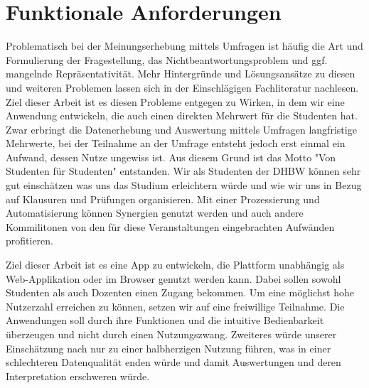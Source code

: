 \section{Funktionale Anforderungen} %
Problematisch bei der Meinungserhebung mittels Umfragen ist häufig die Art und Formulierung der Fragestellung, das Nichtbeantwortungsproblem und ggf. mangelnde Repräsentativität.
Mehr Hintergründe und Lösungsansätze zu diesen und weiteren Problemen lassen sich in der Einschlägigen Fachliteratur nachlesen.
Ziel dieser Arbeit ist es diesen Probleme entgegen zu Wirken, in dem wir eine Anwendung entwickeln, die auch einen direkten Mehrwert für die Studenten hat.
Zwar erbringt die Datenerhebung und Auswertung mittels Umfragen langfristige Mehrwerte, bei der Teilnahme an der Umfrage entsteht jedoch erst einmal ein Aufwand, dessen Nutze ungewiss ist.
Aus diesem Grund ist das Motto "Von Studenten für Studenten" entstanden.
Wir als Studenten der DHBW können sehr gut einschätzen was uns das Studium erleichtern würde und wie wir uns in Bezug auf Klausuren und Prüfungen organisieren.
Mit einer Prozessierung und Automatisierung können Synergien genutzt werden und auch andere Kommilitonen von den für diese Veranstaltungen eingebrachten Aufwänden profitieren. 

Ziel dieser Arbeit ist es eine App zu entwickeln, die Plattform unabhängig als Web-Applikation oder im Browser genutzt werden kann.
Dabei sollen sowohl Studenten als auch Dozenten einen Zugang bekommen.
Um eine möglichst hohe Nutzerzahl erreichen zu können, setzen wir auf eine freiwillige Teilnahme.
Die Anwendungen soll durch ihre Funktionen und die intuitive Bedienbarkeit überzeugen und nicht durch einen Nutzungszwang.
Zweiteres würde unserer Einschätzung nach nur zu einer halbherzigen Nutzung führen, was in einer schlechteren Datenqualität enden würde und damit Auswertungen und deren Interpretation erschweren würde. 

